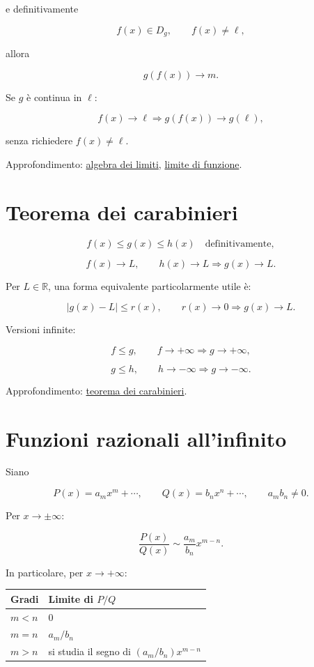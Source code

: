e definitivamente

\[
f(x)\in D_g,
\qquad
f(x)\ne\ell,
\]

allora

\[
g(f(x))\to m.
\]

Se \(g\) è continua in \(\ell\):

\[
f(x)\to\ell
\Longrightarrow
g(f(x))\to g(\ell),
\]

senza richiedere \(f(x)\ne\ell\).

Approfondimento: \href{https://ingegnerismo.it/matematica/algebra-dei-limiti/}{algebra dei limiti}, \href{https://ingegnerismo.it/matematica/limite-di-funzione/}{limite di funzione}.

\section{Teorema dei carabinieri}\label{teorema-dei-carabinieri}

\[
f(x)\le g(x)\le h(x)\quad\text{definitivamente},
\]

\[
f(x)\to L,
\qquad
h(x)\to L
\Longrightarrow
g(x)\to L.
\]

Per \(L\in\mathbb R\), una forma equivalente particolarmente utile è:

\[
|g(x)-L|\le r(x),
\qquad
r(x)\to0
\Longrightarrow
g(x)\to L.
\]

Versioni infinite:

\[
f\le g,
\qquad
f\to+\infty
\Longrightarrow
g\to+\infty,
\]

\[
g\le h,
\qquad
h\to-\infty
\Longrightarrow
g\to-\infty.
\]

Approfondimento: \href{https://ingegnerismo.it/matematica/teorema-dei-carabinieri/}{teorema dei carabinieri}.

\section{Funzioni razionali all'infinito}\label{funzioni-razionali-allinfinito}

Siano

\[
P(x)=a_mx^m+\cdots,
\qquad
Q(x)=b_nx^n+\cdots,
\qquad a_m b_n\ne0.
\]

Per \(x\to\pm\infty\):

\[
\frac{P(x)}{Q(x)}
\sim
\frac{a_m}{b_n}x^{m-n}.
\]

In particolare, per \(x\to+\infty\):

\begin{longtable}[]{@{}ll@{}}
\toprule\noalign{}
Gradi & Limite di \(P/Q\) \\
\midrule\noalign{}
\endhead
\bottomrule\noalign{}
\endlastfoot
\(m<n\) & \(0\) \\
\(m=n\) & \(a_m/b_n\) \\
\(m>n\) & si studia il segno di \((a_m/b_n)x^{m-n}\) \\
\end{longtable}

